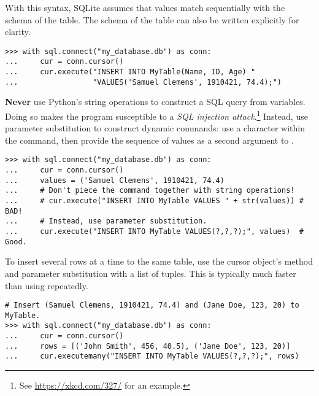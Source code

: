 With this syntax, SQLite assumes that values match sequentially with the schema of the table.
The schema of the table can also be written explicitly for clarity.

\begin{lstlisting}
>>> with sql.connect("my_database.db") as conn:
...     cur = conn.cursor()
...     cur.execute("INSERT INTO MyTable(Name, ID, Age) "
...                 "VALUES('Samuel Clemens', 1910421, 74.4);")
\end{lstlisting}

\begin{warn} %
\textbf{Never} use Python's string operations to construct a SQL query from variables.
Doing so makes the program susceptible to a \emph{SQL injection attack}.\footnote{See \url{https://xkcd.com/327/} for an example.}
Instead, use parameter substitution to construct dynamic commands: use a  character within the command, then provide the sequence of values as a second argument to .

\begin{lstlisting}
>>> with sql.connect("my_database.db") as conn:
...     cur = conn.cursor()
...     values = ('Samuel Clemens', 1910421, 74.4)
...     # Don't piece the command together with string operations!
...     # cur.execute("INSERT INTO MyTable VALUES " + str(values)) # BAD!
...     # Instead, use parameter substitution.
...     cur.execute("INSERT INTO MyTable VALUES(?,?,?);", values)  # Good.
\end{lstlisting}
\end{warn}

To insert several rows at a time to the same table, use the cursor object's  method and parameter substitution with a list of tuples.
This is typically much faster than using  repeatedly.

\begin{lstlisting}
# Insert (Samuel Clemens, 1910421, 74.4) and (Jane Doe, 123, 20) to MyTable.
>>> with sql.connect("my_database.db") as conn:
...     cur = conn.cursor()
...     rows = [('John Smith', 456, 40.5), ('Jane Doe', 123, 20)]
...     cur.executemany("INSERT INTO MyTable VALUES(?,?,?);", rows)
\end{lstlisting}

